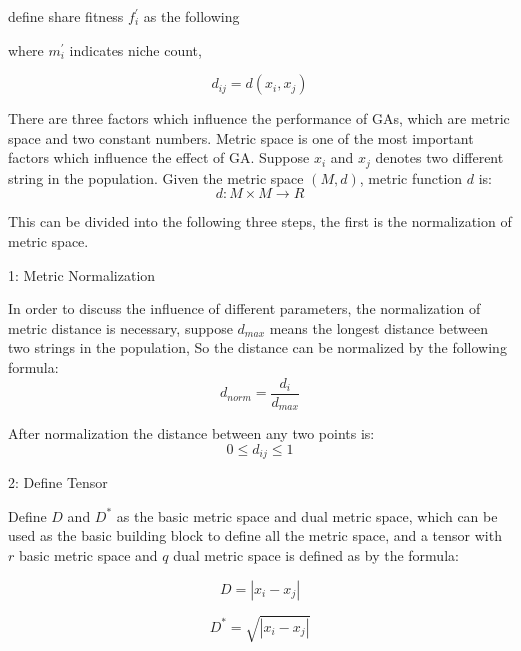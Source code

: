 \documentclass[smallextended]{svjour3}       %
\begin{document}
\begin{multicols}{2}
define share fitness $f_i^{\prime}$ as the following


where $m_i^{\prime}$ indicates niche count,





\begin{equation}
d_{ij} = d(x_i,x_j)
\end{equation}

There are three factors which influence the performance of GAs, which are metric space and two constant numbers.
Metric space is one of the most important factors which influence the effect of GA. 
Suppose $x_i$ and $x_j$ denotes two different string in the population. Given the metric space $(M,d)$,
metric function $d$ is:
$$d: M\times M \rightarrow R$$

This can be divided into the following three steps, the first is the normalization of metric space.

1: Metric Normalization

In order to discuss the influence of different parameters, the normalization of metric distance is 
necessary, suppose $d_{max}$ means the longest distance between two strings in the population, So the 
distance can be normalized by the following formula:
\begin{equation}
d_{norm} = \frac{d_i}{d_{max}}
\end{equation}

After normalization the distance between any two points is:
\begin{equation}
    0 \leq d_{ij}\leq 1 
\end{equation}


2: Define Tensor

Define $D$ and $D^{\ast}$ as the basic metric space and dual metric space, which can be used as the 
basic building block to define all the metric space, and a tensor with $r$ basic metric space and
$q$ dual metric space is defined as by the formula:

\begin{equation}
    D = |x_i-x_j|
\end{equation}

\begin{equation}
    D^{\ast} = \sqrt{|x_i-x_j|}
\end{equation}


\end{multicols}
\end{document}
